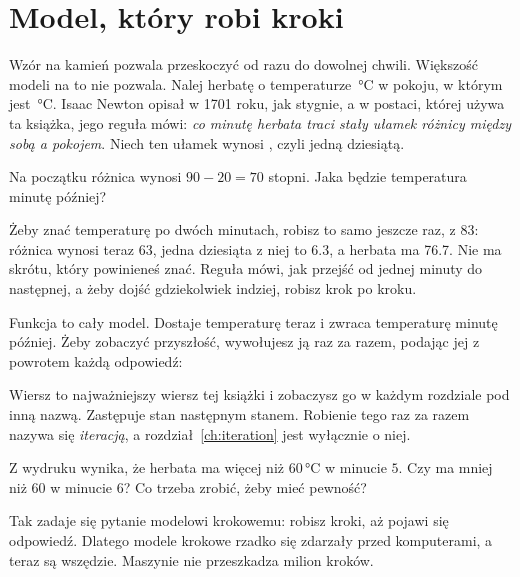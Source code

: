 \section{Model, który robi kroki}
\label{sec:ch01-steps}

\noindent
Wzór na kamień pozwala przeskoczyć od razu do dowolnej chwili. Większość
modeli na to nie pozwala. Nalej herbatę o temperaturze
\,°C w pokoju, w którym jest \,°C.
Isaac Newton opisał w 1701 roku, jak stygnie, a w postaci, której używa ta
książka, jego reguła mówi: \emph{co minutę herbata traci stały ułamek
różnicy między sobą a pokojem}. Niech ten ułamek wynosi ,
czyli jedną dziesiątą.

\begin{think}
Na początku różnica wynosi $90 - 20 = 70$ stopni. Jaka będzie temperatura
minutę później?
\end{think}
Żeby znać temperaturę po dwóch minutach, robisz to samo jeszcze raz, z
$83$: różnica wynosi teraz $63$, jedna dziesiąta z niej to \num{6.3}, a
herbata ma \num{76.7}. Nie ma skrótu, który powinieneś znać. Reguła mówi, jak
przejść od jednej minuty do następnej, a żeby dojść gdziekolwiek indziej,
robisz krok po kroku.


\noindent
Funkcja  to cały model. Dostaje temperaturę teraz i zwraca
temperaturę minutę później. Żeby zobaczyć przyszłość, wywołujesz ją raz za
razem, podając jej z powrotem każdą odpowiedź:



\noindent
Wiersz  to najważniejszy wiersz tej książki i
zobaczysz go w każdym rozdziale pod inną nazwą. Zastępuje stan następnym
stanem. Robienie tego raz za razem nazywa się \emph{iteracją}, a
rozdział~\ref{ch:iteration} jest wyłącznie o niej.

\begin{think}
Z wydruku wynika, że herbata ma więcej niż $60$\,°C w minucie $5$. Czy
ma mniej niż $60$ w minucie $6$? Co trzeba zrobić, żeby mieć pewność?
\end{think}
Tak zadaje się pytanie modelowi krokowemu: robisz kroki, aż pojawi się
odpowiedź. Dlatego modele krokowe rzadko się zdarzały przed komputerami, a
teraz są wszędzie. Maszynie nie przeszkadza milion kroków.

